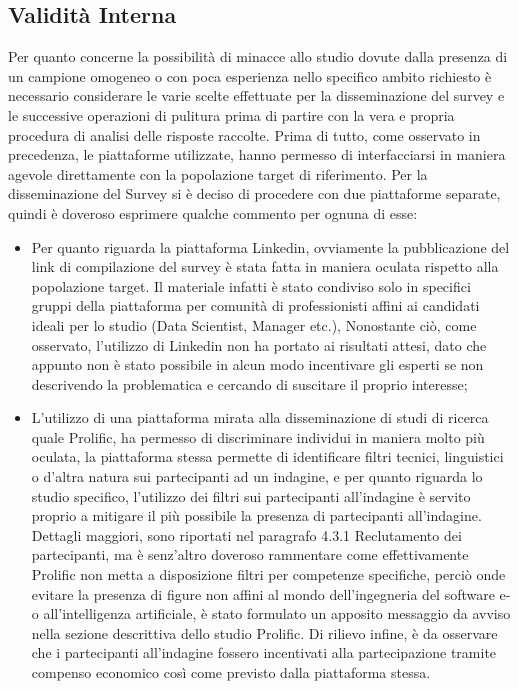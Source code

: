\subsection{Validità Interna}

Per quanto concerne la possibilità di minacce allo studio dovute dalla presenza di un campione omogeneo o con poca esperienza nello specifico ambito richiesto è necessario considerare le varie scelte effettuate per la disseminazione del survey e le successive operazioni di pulitura prima di partire con la vera e propria procedura di analisi delle risposte raccolte. Prima di tutto, come osservato in precedenza, le piattaforme utilizzate,  hanno permesso di interfacciarsi in maniera agevole direttamente con la popolazione target di riferimento. Per la disseminazione del Survey si è deciso di procedere con due piattaforme separate, quindi è doveroso esprimere qualche commento per ognuna di esse:

\begin{itemize}
    \item Per quanto riguarda la piattaforma Linkedin, ovviamente la pubblicazione del link di compilazione del survey è stata fatta in maniera oculata rispetto alla popolazione target. Il materiale infatti è stato condiviso solo in specifici gruppi della piattaforma per comunità di professionisti affini ai candidati ideali per lo studio (Data Scientist, Manager etc.), Nonostante ciò, come osservato, l'utilizzo di Linkedin non ha portato ai risultati attesi, dato che appunto non è stato possibile in alcun modo incentivare gli esperti se non descrivendo la problematica e cercando di suscitare il proprio interesse;
    \item L'utilizzo di una piattaforma mirata alla disseminazione di studi di ricerca quale Prolific, ha permesso di discriminare individui in maniera molto più oculata, la piattaforma stessa permette di identificare filtri tecnici, linguistici o d'altra natura sui partecipanti ad un indagine, e per quanto riguarda lo studio specifico, l'utilizzo dei filtri sui partecipanti all'indagine è servito proprio a mitigare il più possibile la presenza di partecipanti all'indagine. Dettagli maggiori, sono riportati nel paragrafo 4.3.1 Reclutamento dei partecipanti, ma è senz'altro doveroso rammentare come effettivamente Prolific non metta a disposizione filtri per competenze specifiche, perciò onde evitare la presenza di figure non affini al mondo dell'ingegneria del software e-o all'intelligenza artificiale, è stato formulato un apposito messaggio da avviso nella sezione descrittiva dello studio Prolific. Di rilievo infine, è da osservare che i partecipanti all'indagine fossero incentivati alla partecipazione tramite compenso economico così come previsto dalla piattaforma stessa. 
\end{itemize}


